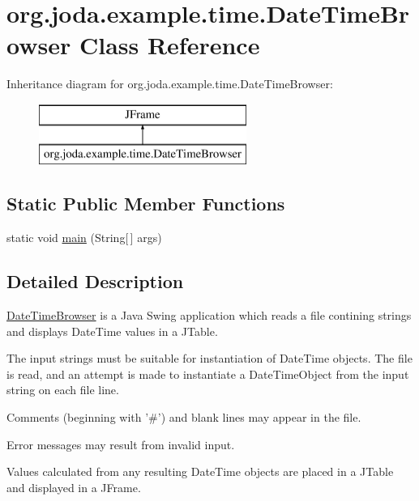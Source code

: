 \hypertarget{classorg_1_1joda_1_1example_1_1time_1_1_date_time_browser}{\section{org.\-joda.\-example.\-time.\-Date\-Time\-Browser Class Reference}
\label{classorg_1_1joda_1_1example_1_1time_1_1_date_time_browser}
}
Inheritance diagram for org.\-joda.\-example.\-time.\-Date\-Time\-Browser\-:\begin{figure}[H]
\begin{center}
\leavevmode
\includegraphics[height=2.000000cm]{classorg_1_1joda_1_1example_1_1time_1_1_date_time_browser}
\end{center}
\end{figure}
\subsection*{Static Public Member Functions}
\begin{DoxyCompactItemize}
\item 
static void \hyperlink{classorg_1_1joda_1_1example_1_1time_1_1_date_time_browser_adeee29c90de61557279b5b7485dc1c4f}{main} (String\mbox{[}$\,$\mbox{]} args)
\end{DoxyCompactItemize}


\subsection{Detailed Description}
\hyperlink{classorg_1_1joda_1_1example_1_1time_1_1_date_time_browser}{Date\-Time\-Browser} is a Java Swing application which reads a file contining strings and displays Date\-Time values in a J\-Table.

The input strings must be suitable for instantiation of Date\-Time objects. The file is read, and an attempt is made to instantiate a Date\-Time\-Object from the input string on each file line.

Comments (beginning with '\#') and blank lines may appear in the file.

Error messages may result from invalid input.

Values calculated from any resulting Date\-Time objects are placed in a J\-Table and displayed in a J\-Frame.

